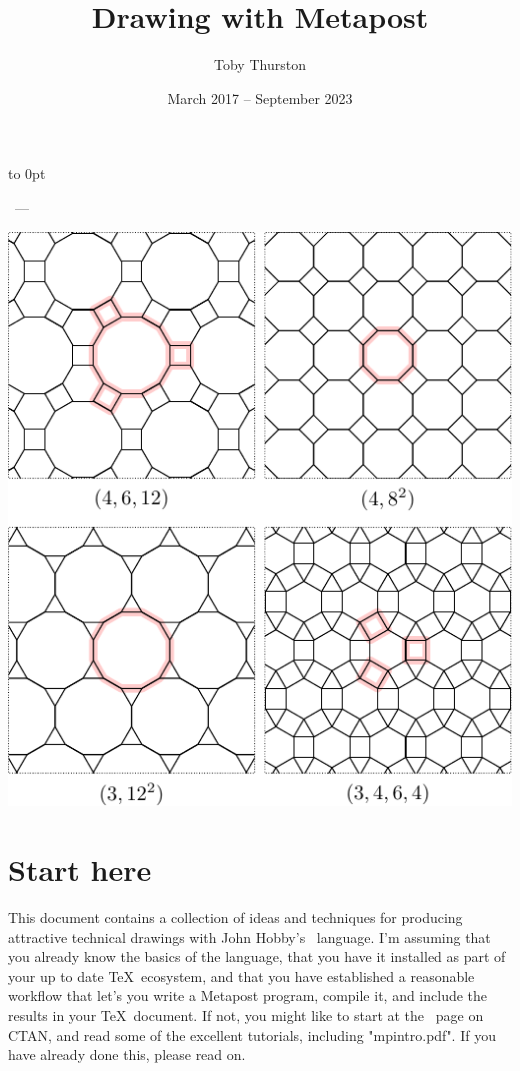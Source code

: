 \documentclass[a4paper,landscape]{article}
\title{Drawing with Metapost}
\author{Toby Thurston}
\date{March 2017 – September 2023}
\begin{document}
\let\folio\thepage
\renewcommand{\thepage}{\rlap{\hbox to 5in{\hss\small\folio}}}
\pagestyle{myheadings}
\raggedbottom
\makeatletter
\moveright 6in\vbox to
0pt{\vskip23pt\noindent\sffamily{\Large\bfseries\@title}\par\bigskip
    \noindent\@author\ --- \@date\par
    \bigskip\noindent
    \includegraphics{archimedes.pdf}
\vss}
\makeatother
\thispagestyle{empty}
\section{Start here}

This document contains a collection of ideas and techniques for producing attractive
technical drawings with John Hobby’s \MP\ language.  I’m assuming that you already
know the basics of the language, that you have it installed as part of your up to
date \TeX\ ecosystem, and that you have established a reasonable workflow that
let’s you write a Metapost program, compile it, and include the results in your
\TeX\ document.  If not, you might like to start at the \MP\ page on CTAN, and read
some of the excellent tutorials, including "mpintro.pdf".  If you have already done
this, please read on.
\end{document}
